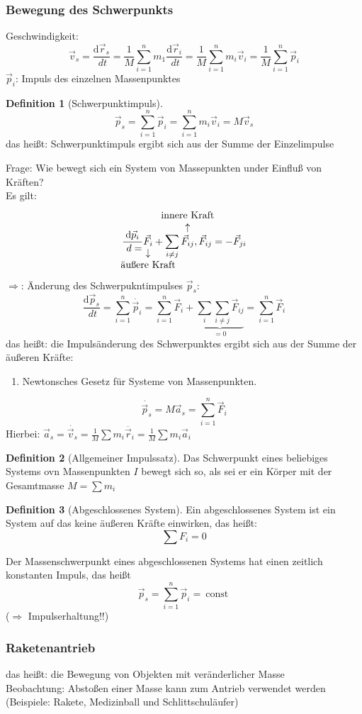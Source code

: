 \documentclass[a4paper]{scrartcl}
\renewcommand{\d}{\mathrm{d}}
\renewcommand{\v}[1]{\vec{#1}}
\newcommand{\dd}[2]{\frac{\d #1}{\ d#2}}
\theoremstyle{definition}
\newtheorem{defn}{Definition}
\theoremstyle{plain}
\theoremstyle{plain}
\theoremstyle{remark}
\theoremstyle{remark}
\theoremstyle{remark}
\begin{document}
\subsubsection{Bewegung des Schwerpunkts}
\label{sec-6-1-1}
Geschwindigkeit:
\[\v v_s = \dd{\v r_s}{t} = \frac{1}{M} \sum_{i = 1}^n m_1 \dd{\v r_i}{t} = \frac{1}{M} \sum_{i = 1}^n m_i \v v_i = \frac{1}{M}\sum_{i = 1}^n \v p_i\]
$\v p_i$: Impuls des einzelnen Massenpunktes
\begin{defn}[Schwerpunktimpuls]
\[\v p_s = \sum_{i = 1}^{n}\v p_i = \sum_{i = 1}^{n} m_i \v v_i = M \v v_s\]
das heißt: Schwerpunktimpuls ergibt sich aus der Summe der Einzelimpulse
\end{defn}
Frage: Wie bewegt sich ein System von Massepunkten under Einfluß von Kräften? \\
    Es gilt:
\[\dd{\v p_i} = \underarrow[\v F_i]{äußere Kraft} + \sum_{i\neq j}^{}\overarrow[\v F_{i j}]{innere Kraft}, \v F_{ij} = - \v F_{j i}\]
$\Rightarrow$: Änderung des Schwerpukntimpulses $\v p_s$:
\[ \dd{\v p_s}{t} = \sum_{i = 1}^{n}\dot{\v p_i} = \sum_{i = 1}^{n}\v F_i + \underbrace{ \sum_{i} \sum_{i\neq j} \v F_{ij}}_{= 0} = \sum_{i = 1}^{n} \v F_i\]
das heißt: die Impulsänderung des Schwerpunktes ergibt sich aus der Summe der äußeren Kräfte:
\begin{enumerate}
\item Newtonsches Gesetz für Systeme von Massenpunkten.
\end{enumerate}
\[\dot{\v p_s} = M \v a_s = \sum_{i = 1}^{n}\v F_i\]
Hierbei: $\v a_s = \dot{\v v_s} = \frac{1}{M} \sum m_i \ddot{\v r_i} = \frac{1}{M} \sum m_i \v a_i$

\begin{defn}[Allgemeiner Impulssatz]
Das Schwerpunkt eines beliebiges Systems ovn Massenpunkten $I$ bewegt sich so, als sei er ein Körper mit der Gesamtmasse $M = \sum m_i$
\end{defn}
\begin{defn}[Abgeschlossenes System]
Ein abgeschlossenes System ist ein System auf das keine äußeren Kräfte einwirken, das heißt:
\[\sum F_i = 0\]
\end{defn}

Der Massenschwerpunkt eines abgeschlossenen Systems hat einen zeitlich konstanten Impuls, das heißt
\[\v p_s = \sum_{i = 1}^{n} \v p_i =~\text{const}~\]
($\Rightarrow$ Impulserhaltung!!)
\subsubsection{Raketenantrieb}
\label{sec-6-1-2}
das heißt: die Bewegung von Objekten mit veränderlicher Masse \\
    Beobachtung: Abstoßen einer Masse kann zum Antrieb verwendet werden (Beispiele: Rakete, Medizinball und Schlittschuläufer)
\end{document}
